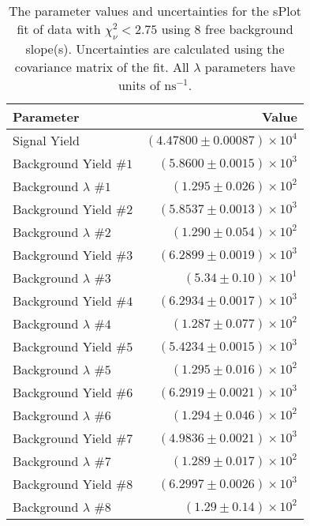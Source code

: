 
\begin{table}
    \begin{center}
        \begin{tabular}{lr}\toprule
            Parameter & Value \\\midrule
            Signal Yield & $(4.47800 \pm 0.00087) \times 10^{4}$ \\
            Background Yield $\#1$ & $(5.8600 \pm 0.0015) \times 10^{3}$ \\
            Background $\lambda$ $\#1$ & $(1.295 \pm 0.026) \times 10^{2}$ \\
            Background Yield $\#2$ & $(5.8537 \pm 0.0013) \times 10^{3}$ \\
            Background $\lambda$ $\#2$ & $(1.290 \pm 0.054) \times 10^{2}$ \\
            Background Yield $\#3$ & $(6.2899 \pm 0.0019) \times 10^{3}$ \\
            Background $\lambda$ $\#3$ & $(5.34 \pm 0.10) \times 10^{1}$ \\
            Background Yield $\#4$ & $(6.2934 \pm 0.0017) \times 10^{3}$ \\
            Background $\lambda$ $\#4$ & $(1.287 \pm 0.077) \times 10^{2}$ \\
            Background Yield $\#5$ & $(5.4234 \pm 0.0015) \times 10^{3}$ \\
            Background $\lambda$ $\#5$ & $(1.295 \pm 0.016) \times 10^{2}$ \\
            Background Yield $\#6$ & $(6.2919 \pm 0.0021) \times 10^{3}$ \\
            Background $\lambda$ $\#6$ & $(1.294 \pm 0.046) \times 10^{2}$ \\
            Background Yield $\#7$ & $(4.9836 \pm 0.0021) \times 10^{3}$ \\
            Background $\lambda$ $\#7$ & $(1.289 \pm 0.017) \times 10^{2}$ \\
            Background Yield $\#8$ & $(6.2997 \pm 0.0026) \times 10^{3}$ \\
            Background $\lambda$ $\#8$ & $(1.29 \pm 0.14) \times 10^{2}$ \\\bottomrule
        \end{tabular}
        \caption{The parameter values and uncertainties for the sPlot fit of data with $\chi^2_\nu < 2.75$ using 8 free background slope(s). Uncertainties are calculated using the covariance matrix of the fit. All $\lambda$ parameters have units of $\si{\nano\second}^{-1}$.}
    \end{center}
\end{table}

